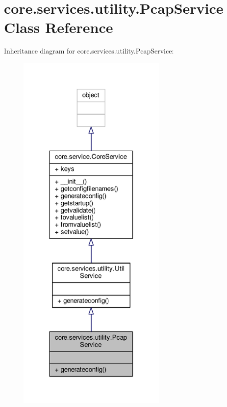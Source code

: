 \hypertarget{classcore_1_1services_1_1utility_1_1_pcap_service}{\section{core.\+services.\+utility.\+Pcap\+Service Class Reference}
\label{classcore_1_1services_1_1utility_1_1_pcap_service}
}


Inheritance diagram for core.\+services.\+utility.\+Pcap\+Service\+:
\nopagebreak
\begin{figure}[H]
\begin{center}
\leavevmode
\includegraphics[width=207pt]{classcore_1_1services_1_1utility_1_1_pcap_service__inherit__graph}
\end{center}
\end{figure}


